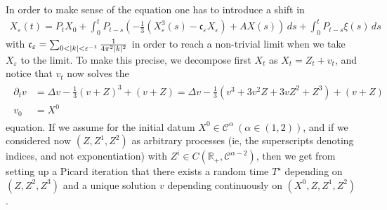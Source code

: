 \documentclass{report}
\newcommand{\RR}{\mathbb{R}}
\DeclarePairedDelimiter\abs{\lvert}{\rvert} %
\theoremstyle{remark}
\theoremstyle{definition}
\let\epsilon\varepsilon
\begin{document}
In order to make sense of the equation one has to introduce a shift in
\begin{align}
  X_\epsilon(t) = P_t X_0 + \int_{0}^{t}P_{t-s}\left(-\frac{1}{3}\left(X^3_\epsilon(s) - \mathfrak{c}_\epsilon X_\epsilon\right)+ A X(s)\right)\,ds + \int_0^t P_{t-s} \xi(s) \,ds
\end{align}
with $\mathfrak{c}_\epsilon = \sum_{0 < \abs{k} < \epsilon^{-1}} \frac{1}{4 \pi^2 \abs{k}^2}$ in order to reach a non-trivial limit when we take $X_\epsilon$ to the limit. To make this precise, we decompose first $X_t$ as $X_t = Z_t + v_t$, and notice that $v_t$ now solves the 
\begin{align}
  \label{eq:phi_eq_in_v}
  \begin{split}
    \partial_t v &= \Delta v - \frac{1}{3}(v + Z)^3 + (v + Z) = \Delta v - \frac{1}{3}(v^3 + 3v^2 Z + 3v Z^2 + Z^3) + (v+Z)\\
    v_0 &= X^0
  \end{split}
\end{align}
equation. If we assume for the initial datum $X^0 \in \mathcal{C}^\alpha~(\alpha \in (1, 2))$, and if we considered now $(Z, Z^1, Z^2)$ as arbitrary processes (ie, the superscripts denoting indices, and not exponentiation) with $Z^i \in {C}(\RR_+, \mathcal{C}^{\alpha-2})$, then we get from setting up a Picard iteration that there exists a random time $T^\star$ depending on $(Z, Z^2, Z^3)$ and a unique solution $v$ depending continuously on $(X^0, Z, Z^1, Z^2)$ \cite[Theorem 4.10.]{perkowski2024stochaIV}.
\end{document}
